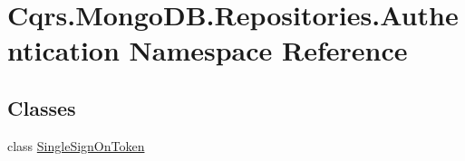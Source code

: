 \hypertarget{namespaceCqrs_1_1MongoDB_1_1Repositories_1_1Authentication}{}\section{Cqrs.\+Mongo\+D\+B.\+Repositories.\+Authentication Namespace Reference}
\label{namespaceCqrs_1_1MongoDB_1_1Repositories_1_1Authentication}
\subsection*{Classes}
\begin{DoxyCompactItemize}
\item 
class \hyperlink{classCqrs_1_1MongoDB_1_1Repositories_1_1Authentication_1_1SingleSignOnToken}{Single\+Sign\+On\+Token}
\end{DoxyCompactItemize}
